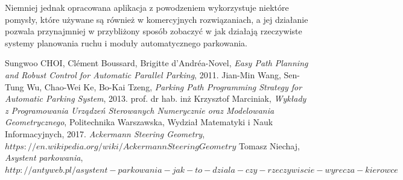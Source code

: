 \documentclass[a4paper,11pt,twoside]{report}
\theoremstyle{definition}
\begin{document}
Niemniej jednak opracowana aplikacja z powodzeniem wykorzystuje niektóre pomysły, które używane są również w komercyjnych rozwiązaniach, a jej działanie pozwala przynajmniej w przybliżony sposób zobaczyć w jak działają rzeczywiste systemy planowania ruchu i moduły automatycznego parkowania.


\begin{thebibliography}{20}%

 Sungwoo CHOI, Clément Boussard, Brigitte d’Andréa-Novel, \emph{Easy Path Planning and Robust Control for Automatic Parallel Parking}, 2011.
  Jian-Min Wang, Sen-Tung Wu, Chao-Wei Ke, Bo-Kai Tzeng, \emph{Parking Path Programming Strategy for Automatic Parking System}, 2013.
 prof. dr hab. inż Krzysztof Marciniak, \emph{Wykłady z Programowania Urządzeń Sterowanych Numerycznie oraz Modelowania Geometrycznego}, Politechnika Warszawska, Wydział Matematyki i Nauk Informacyjnych, 2017.
 \emph{Ackermann Steering Geometry}, $https://en.wikipedia.org/wiki/AckermannSteeringGeometry$
 Tomasz Niechaj, \emph{Asystent parkowania}, $http://antyweb.pl/asystent-parkowania-jak-to-dziala-czy-rzeczywiscie-wyrecza-kierowce$
\end{thebibliography}
\thispagestyle{empty}





\listoffigures
\thispagestyle{empty}


\renewcommand{\listtablename}{Spis tabel}
\listoftables
\thispagestyle{empty}
\end{document}
